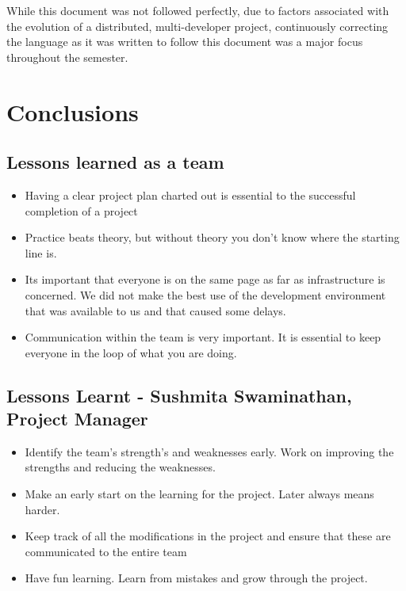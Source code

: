 \documentclass[letterpaper,11pt]{article}
\begin{document}
{While this document was not followed perfectly, due to factors associated with the evolution of a distributed, multi-developer project, continuously correcting the language as it was written to follow this document was a major focus throughout the semester.

\section{Conclusions}

\subsection{Lessons learned as a team}

\begin{itemize}

\item
 Having a clear project plan charted out is essential to the successful completion of a project
\item
 Practice beats theory, but without theory you don't know where the starting line is.
\item
 Its important that everyone is on the same page as far as infrastructure is concerned. We did not make the best use of the development environment
that was available to us and that caused some delays.
\item
 Communication within the team is very important. It is essential to keep everyone in the loop of what you are doing.

\end{itemize}


\subsection{Lessons Learnt - Sushmita Swaminathan, Project Manager}

\begin{itemize}

\item Identify the team's strength's and weaknesses early. Work on improving the strengths and reducing the weaknesses.
\item Make an early start on the learning for the project. Later always means harder.
\item Keep track of all the modifications in the project and ensure that these are communicated to the entire team
\item Have fun learning. Learn from mistakes and grow through the project.


\end{itemize}}
\end{document}
